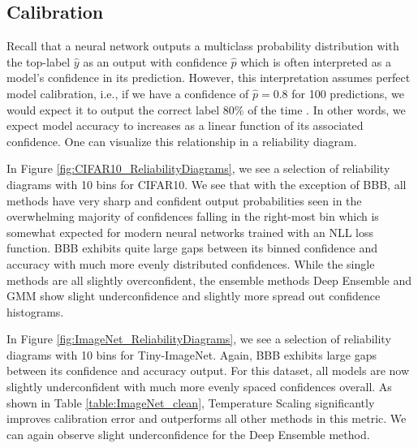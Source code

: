 \documentclass[a4paper, 11pt, oneside]{scrartcl}
\theoremstyle{break}
\numberwithin{equation}{section}
\begin{document}
		\subsection{Calibration}
			Recall that a neural network outputs a multiclass probability distribution with the top-label $\hat{y}$ as an output with confidence $\hat{p}$ which is often interpreted as a model's confidence in its prediction. 
			However, this interpretation assumes perfect model calibration, i.e., if we have a confidence of $\hat{p} = 0.8$ for 100 predictions, we would expect it to output the correct label 80\% of the time \parencite{GPS17}. 
			In other words, we expect model accuracy to increases as a linear function of its associated confidence. 
			One can visualize this relationship in a reliability diagram. 

			In Figure \ref{fig:CIFAR10_ReliabilityDiagrams}, we see a selection of reliability diagrams with 10 bins for CIFAR10.
			We see that with the exception of BBB, all methods have very sharp and confident output probabilities seen in the overwhelming majority of confidences falling in the right-most bin which is somewhat expected for modern neural networks trained with an NLL loss function.
			BBB exhibits quite large gaps between its binned confidence and accuracy with much more evenly distributed confidences. 
			While the single methods are all slightly overconfident, the ensemble methods Deep Ensemble and GMM show slight underconfidence and slightly more spread out confidence histograms. 

			In Figure \ref{fig:ImageNet_ReliabilityDiagrams}, we see a selection of reliability diagrams with 10 bins for Tiny-ImageNet.
			Again, BBB exhibits large gaps between its confidence and accuracy output.
			For this dataset, all models are now slightly underconfident with much more evenly spaced confidences overall. 
			As shown in Table \ref{table:ImageNet_clean}, Temperature Scaling significantly improves calibration error and outperforms all other methods in this metric.
			We can again observe slight underconfidence for the Deep Ensemble method.
\end{document}
